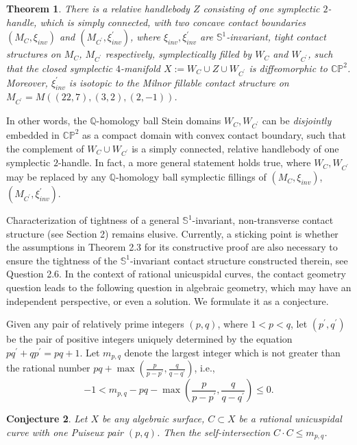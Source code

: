 \documentclass[11pt]{amsart}
\theoremstyle{plain}
\newtheorem{theorem}{Theorem}
\numberwithin{theorem}{section}
\newtheorem{conjecture}[theorem]{Conjecture}
\theoremstyle{definition}
\newcommand{\C}{{\mathbb C}}
\newcommand{\Q}{{\mathbb Q}}
\renewcommand{\P}{{\mathbb P}}
\newcommand{\s}{{\mathbb S}}
\begin{document}
\begin{theorem}
There is a relative handlebody $Z$ consisting of one symplectic $2$-handle, which is simply connected, with two concave contact boundaries $(M_C,\xi_{inv})$ and 
$(M_{C^\prime}, \xi_{inv}^\prime)$, where $\xi_{inv}, \xi_{inv}^\prime$ are $\s^1$-invariant, tight contact structures on $M_C$, $M_{C^\prime}$ respectively, symplectically filled by $W_C$ and $W_{C^\prime}$, such that the closed symplectic $4$-manifold 
$X:=W_C\cup Z\cup W_{C^\prime}$ is diffeomorphic to $\C\P^2$. Moreover, $\xi_{inv}^\prime$ is isotopic to the Milnor fillable contact structure on $M_{C^\prime}=M((22,7),(3,2),(2,-1))$. 
\end{theorem}

In other words, the $\Q$-homology ball Stein domains $W_C,W_{C^\prime}$ can be {\it disjointly} embedded in $\C\P^2$ as a compact domain with convex contact boundary, such that the complement of $W_C\cup W_{C^\prime}$ is a simply connected, relative handlebody of one symplectic $2$-handle. In fact, a more general statement holds true, where $W_C,W_{C^\prime}$ may be replaced by any $\Q$-homology ball symplectic fillings of $(M_C,\xi_{inv})$, $(M_{C^\prime}, \xi_{inv}^\prime)$. 

\vspace{2mm}

Characterization of tightness of a general $\s^1$-invariant, non-transverse contact structure (see Section 2) remains elusive. Currently, a sticking point is whether the assumptions in Theorem 2.3 for its constructive proof are also necessary to ensure the tightness of the $\s^1$-invariant contact structure constructed therein, see Question 2.6. In the context of rational unicuspidal curves, the contact geometry question leads to the following question in algebraic geometry, which may have an independent perspective, or even a solution. We formulate it as a conjecture. 

Given any pair of relatively prime integers $(p,q)$, where $1<p<q$, let $(p^\prime,q^\prime)$ be the pair of positive integers uniquely determined by the equation $pq^\prime+q p^\prime=pq+1$. Let $m_{p,q}$ denote the largest integer which is not greater than the rational number $pq+ \max (\frac{p}{p-p^\prime},\frac{q}{q-q^\prime})$, i.e., 
$$
-1<m_{p,q}-pq-\max (\frac{p}{p-p^\prime},\frac{q}{q-q^\prime})\leq 0.
$$

\begin{conjecture}
Let $X$ be any algebraic surface, $C\subset X$ be a rational unicuspidal curve with one Puiseux pair 
$(p,q)$. Then the self-intersection $C\cdot C\leq m_{p,q}$.
\end{conjecture}
\end{document}
